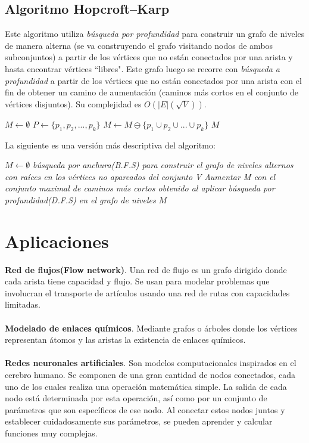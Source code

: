 \documentclass[12pt,a4paper]{article}
\begin{document}
\subsection{Algoritmo Hopcroft–Karp}
Este algoritmo utiliza \textit{búsqueda por profundidad} para construir un grafo de niveles de manera alterna (se va construyendo el grafo visitando nodos de ambos subconjuntos) a partir de los vértices que no están conectados por una arista y hasta encontrar vértices ``libres". Este grafo luego se recorre con \textit{búsqueda a profundidad} a partir de los vértices que no están conectados por una arista con el fin de obtener un camino de aumentación (caminos más cortos en el conjunto de vértices disjuntos). Su complejidad es $O(|E|(\sqrt{V}))$.

\begin{center}
	\begin{algorithmic}[1]
		\STATE $M\gets \emptyset$
		\REPEAT
			\STATE $P\gets \{p_1, p_2, ..., p_k\}$
			\STATE $M\gets M \ominus \{p_1 \cup p_2 \cup ... \cup p_k\}$
	\RETURN $M$
	\end{algorithmic}
\end{center}

\noindent La siguiente es una versión más descriptiva del algoritmo:

\begin{center}
	\begin{algorithmic}[1]
		\STATE $M\gets \emptyset$
		\REPEAT
			\STATE \textit{búsqueda por anchura(B.F.S) para construir el grafo de niveles alternos con raíces en los vértices no apareados del conjunto V}
			\STATE \textit{Aumentar M con el conjunto maximal de caminos más cortos obtenido al aplicar búsqueda por profundidad(D.F.S) en el grafo de niveles}
		\RETURN $M$
	\end{algorithmic}
\end{center}

\section{Aplicaciones} \noindent
\textbf{Red de flujos(Flow network)}. Una red de flujo es un grafo dirigido donde cada arista tiene capacidad y flujo. Se usan para modelar problemas que involucran el transporte de artículos usando una red de rutas con capacidades limitadas\cite{brilliant}.\\\\
\textbf{Modelado de enlaces químicos}. Mediante grafos o árboles donde los vértices representan átomos y las aristas la existencia de enlaces químicos\cite{brilliant}.\\\\
\textbf{Redes neuronales artificiales}. Son modelos computacionales inspirados en el cerebro humano. Se componen de una gran cantidad de nodos conectados, cada uno de los cuales realiza una operación matemática simple. La salida de cada nodo está determinada por esta operación, así como por un conjunto de parámetros que son específicos de ese nodo. Al conectar estos nodos juntos y establecer cuidadosamente sus parámetros, se pueden aprender y calcular funciones muy complejas\cite{brilliant}.
\end{document}
